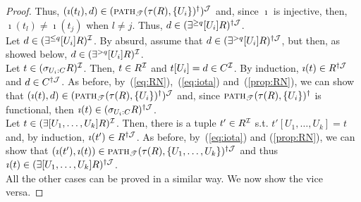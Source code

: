 \documentclass[envcountsame,draft]{llncs}
\newcommand{\pth}[2]{\ensuremath{\textsc{path}_{\mathscr{T}}(#1,#2)}\xspace}
\begin{document}
\begin{proof}
  Thus, $(\imath(t_l),d)\in (\pth{\tau(R)}{\{U_i\}}^\dag)^\Jmc$ and,
  since $\imath$ is injective, then, $\imath(t_l)\neq \imath(t_j)$
  when $l\neq j$. Thus,  $d\in(\exists^{\geq q}[{U_i}] R)^{\dag\mathcal{J}}$.\\
%
  Let $d\in(\exists^{\leq q}[{U_i}] R)^{\mathcal{I}}$. By absurd, assume
  that $d\in(\exists^{>q}[{U_i}] R)^{\dag \mathcal{J}}$, but then, as showed
  below, $d\in(\exists^{> q}[{U_i}] R)^{\mathcal{I}}$.
\\%
  Let $t\in(\sigma_{U_i : C} R)^\mathcal{I}$. Then, $t\in R^\mathcal{I}$ and
  $t[U_i]=d\in C^\mathcal{I}$. By induction, $\imath(t)\in R^{\dag\mathcal{J}}$ and
  $d\in C^{\dag\mathcal{J}}$. As before, by~(\ref{eq:RN}),~(\ref{eq:iota}) and~(\ref{prop:RN}),
  we can show that
  $(\imath(t),d)\in (\pth{\tau(R)}{\{U_i\}}^\dag)^\Jmc$ and, since
  $\pth{\tau(R)}{\{U_i\}}^{\dag}$ is functional, then
  $\imath(t)\in(\sigma_{U_i : C} R)^{\dag\mathcal{J}}$.
  \\
%
  Let $t\in(\exists[U_1,\ldots,U_k] R)^{\mathcal{I}}$. Then, there is a tuple
  $t'\in R^\mathcal{I}$ s.t. $t'[U_1,\ldots,U_k]=t$ and, by induction,
  $\imath(t')\in R^{\dag\mathcal{J}}$. As before,
  by~(\ref{eq:iota}) and (\ref{prop:RN}), we can show that
  $(\imath(t'),\imath(t))\in
  \pth{\tau(R)}{\{U_1,\ldots,U_k\}}^{\dag\Jmc}$ and thus
  $\imath(t)\in(\exists[U_1,\ldots,U_k] R)^{\dag\mathcal{J}}$.\\
%
  All the other cases can be proved in a similar way. We now show the
  vice versa.

  \smallskip


\end{proof}
\end{document}
